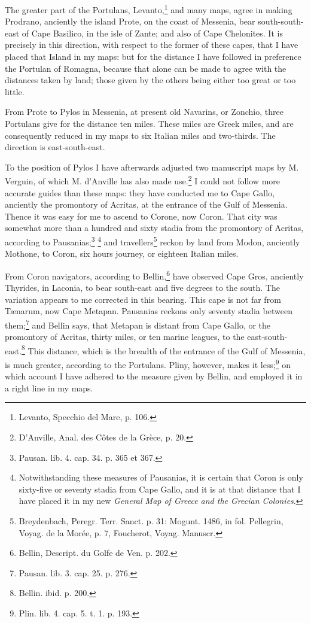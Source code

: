 \documentclass[a4paper, 11pt, oneside, polutonikogreek, english]{article}
\begin{document}
The greater part of the Portulans, Levanto,\footnote{Levanto, Specchio del Mare, p. 106.} and many maps, agree in making Prodrano, anciently the island Prote, on the coast of Messenia, bear south-south-east of Cape Basilico, in the isle of Zante; and also of Cape Chelonites. It is precisely in this direction, with respect to the former of these capes, that I have placed that Island in my maps: but for the distance I have followed in preference the Portulan of Romagna, because that alone can be made to agree with the distances taken by land; those given by the others being either too great or too little.

From Prote to Pylos in Messenia, at present old Navarins, or Zonchio, three Portulans give for the distance ten miles. These miles are Greek miles, and are consequently reduced in my maps to six Italian miles and two-thirds. The direction is east-south-east.

To the position of Pylos I have afterwards adjusted two manuscript maps by M. Verguin, of which M. d'Anville has also made use.\footnote{D'Anville, Anal. des Côtes de la Grèce, p. 20.} I could not follow more accurate guides than these maps: they have conducted me to Cape Gallo, anciently the promontory of Acritas, at the entrance of the Gulf of Messenia. Thence it was easy for me to ascend to Corone, now Coron. That city was somewhat more than a hundred and sixty stadia from the promontory of Acritas, according to Pausanias;\footnote{Pausan. lib. 4. cap. 34. p. 365 et 367.} \footnote{Notwithstanding these measures of Pausanias, it is certain that Coron is only sixty-five or seventy stadia from Cape Gallo, and it is at that distance that I have placed it in my new \emph{General Map of Greece and the Grecian Colonies}.} and travellers\footnote{Breydenbach, Peregr. Terr. Sanct. p. 31: Mogunt. 1486, in fol. Pellegrin, Voyag. de la Morée, p. 7, Foucherot, Voyag. Manuscr.} reckon by land from Modon, anciently Mothone, to Coron, six hours journey, or eighteen Italian miles.

From Coron navigators, according to Bellin,\footnote{Bellin, Descript. du Golfe de Ven. p. 202.} have observed Cape Gros, anciently Thyrides, in Laconia, to bear south-east and five degrees to the south. The variation appears to me corrected in this bearing. This cape is not far from Tænarum, now Cape Metapan. Pausanias reckons only seventy stadia between them;\footnote{Pausan. lib. 3. cap. 25. p. 276.} and Bellin says, that Metapan is distant from Cape Gallo, or the promontory of Acritas, thirty miles, or ten marine leagues, to the east-south-east.\footnote{Bellin. ibid. p. 200.} This distance, which is the breadth of the entrance of the Gulf of Messenia, is much greater, according to the Portulans. Pliny, however, makes it less;\footnote{Plin. lib. 4. cap. 5. t. 1. p. 193.} on which account I have adhered to the measure given by Bellin, and employed it in a right line in my maps.
\end{document}
